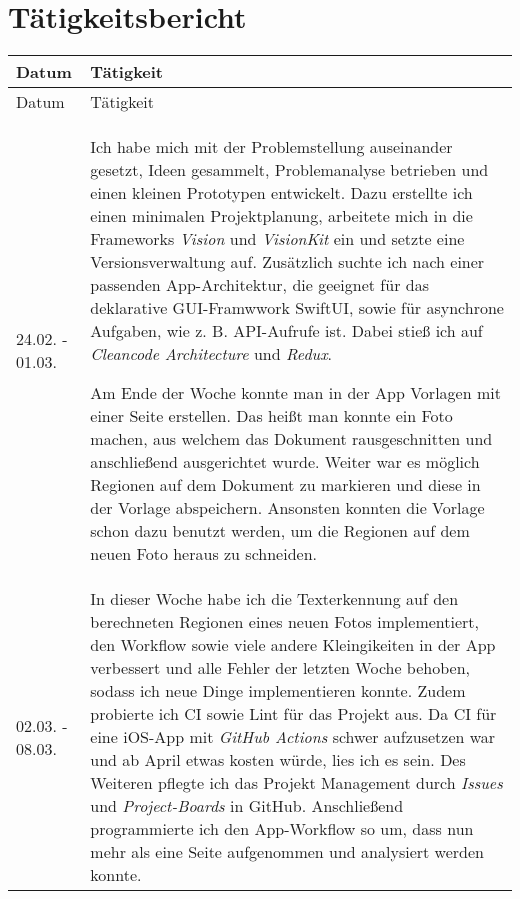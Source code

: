 \documentclass[nomenclature, 150]{HSMW-Thesis}
\begin{document}
\chapter{Tätigkeitsbericht}
	\begin{longtable}[h!]{ p{4em} | p{356pt} }
		Datum & Tätigkeit \\ \hline
		\endfirsthead
		Datum & Tätigkeit \\ \hline
 		\endhead

 		\hline
 		\endfoot
		
		24.02. - 01.03. & 
			Ich habe mich mit der Problemstellung auseinander gesetzt, Ideen gesammelt, Problemanalyse betrieben und einen kleinen Prototypen entwickelt. Dazu erstellte ich einen minimalen Projektplanung, arbeitete mich in die Frameworks \textit{Vision} und \textit{VisionKit} ein und setzte eine Versionsverwaltung auf. Zusätzlich suchte ich nach einer passenden App-Architektur, die geeignet für das deklarative GUI-Framwwork SwiftUI, sowie für asynchrone Aufgaben, wie z. B. API-Aufrufe ist. Dabei stieß ich auf \textit{Cleancode Architecture} und \textit{Redux}.
				
			Am Ende der Woche konnte man in der App Vorlagen mit einer Seite erstellen. Das heißt man konnte ein Foto machen, aus welchem das Dokument rausgeschnitten und anschließend ausgerichtet wurde. Weiter war es möglich Regionen auf dem Dokument zu markieren und diese in der Vorlage abspeichern. Ansonsten konnten die Vorlage schon dazu benutzt werden, um die Regionen auf dem neuen Foto heraus zu schneiden.
			\\ \hline
		02.03. - 08.03. &
			In dieser Woche habe ich die Texterkennung auf den berechneten Regionen eines neuen Fotos implementiert, den Workflow sowie viele andere Kleingikeiten in der App verbessert und alle Fehler der letzten Woche behoben, sodass ich neue Dinge implementieren konnte. Zudem probierte ich CI sowie Lint für das Projekt aus. Da CI für eine iOS-App mit \textit{GitHub Actions} schwer aufzusetzen war und ab April etwas kosten würde, lies ich es sein. Des Weiteren pflegte ich das Projekt Management durch \textit{Issues} und \textit{Project-Boards} in GitHub. Anschließend programmierte ich den App-Workflow so um, dass nun mehr als eine Seite aufgenommen und analysiert werden konnte. 
				

\end{longtable}
\end{document}
